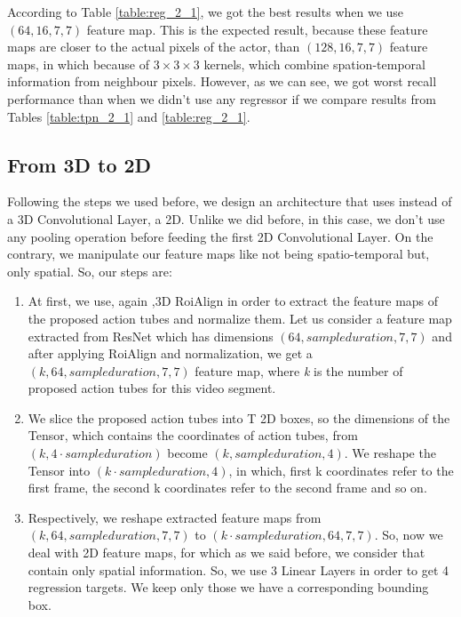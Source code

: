 According to Table \ref{table:reg_2_1}, we got the best results when we use $(64,16,7,7)$ feature map. This is the expected result, because these feature maps
are closer to the actual pixels of the actor, than $(128,16,7,7)$ feature maps, in which because of $3 \times 3 \times 3$ kernels, which combine spation-temporal
information from neighbour pixels. However, as we can see, we got worst recall performance than when we didn't use any regressor if we compare results from Tables
\ref{table:tpn_2_1} and \ref{table:reg_2_1}.

\subsection{From 3D to 2D}

Following the steps we used before, we design an architecture that uses instead of a 3D Convolutional Layer, a 2D. Unlike we did before, in this case, we don't
use any pooling operation before feeding the first 2D Convolutional Layer. On the contrary, we manipulate our feature maps like not being spatio-temporal but,
only spatial. So, our steps are:
\begin{enumerate}
\item At first, we use, again ,3D RoiAlign in order to extract the feature maps of the proposed action tubes and normalize them. Let us consider a feature map
  extracted from ResNet which has dimensions $(64,sample duration,7,7)$ and after applying RoiAlign and normalization, we get a $(k,64,sample duration,7,7)$ feature map,
  where \textit{k} is the number of proposed  action tubes for this video segment.
\item We slice the proposed action tubes into T 2D boxes, so the dimensions of the Tensor, which contains the coordinates of action tubes, from $(k,4\cdot sample duration)$
  become $(k,sample duration, 4)$. We reshape the Tensor into $(k\cdot sample duration, 4)$, in which, first k coordinates refer to the first frame, the
  second k coordinates refer to the second frame and so on.
\item Respectively, we reshape extracted feature maps from $(k, 64, sample duration, 7, 7)$ to $(k\cdot sample duration, 64, 7, 7)$. So, now we deal with 2D feature maps, for which as we said before,
  we consider that contain only spatial information. So, we use 3 Linear Layers in order to get 4 regression targets. We keep only those we have a corresponding bounding
  box.
\end{enumerate}

